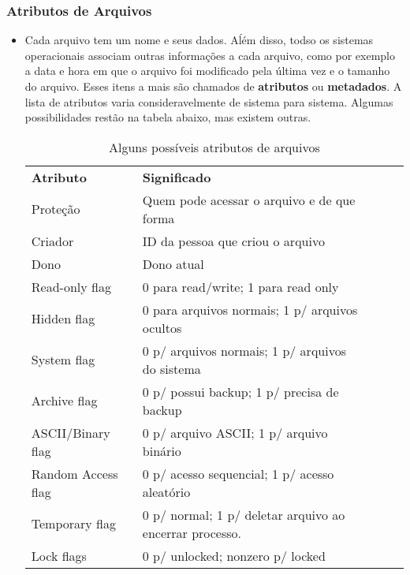 \documentclass[10pt]{article}
\begin{document}
\subsubsection{Atributos de Arquivos}
\begin{itemize}
    \item Cada arquivo tem um nome e seus dados. Aĺém disso, todso os sistemas operacionais associam outras informações a cada
    arquivo, como por exemplo a data e hora em que o arquivo foi modificado pela última vez e o tamanho do arquivo. Esses
    itens a mais são chamados de \textbf{atributos} ou \textbf{metadados}. A lista de atributos varia consideravelmente
    de sistema para sistema. Algumas possibilidades restão na tabela abaixo, mas existem outras.
    \begin{table}[!h]
        \centering
        \caption{Alguns possíveis atributos de arquivos}
        \label{atributos_arquivos}
        \begin{tabular}{lllll}
        \textbf{Atributo}       & \textbf{Significado}                                     &  &  &  \\
        Proteção                & Quem pode acessar o arquivo e de que forma               &  &  &  \\
        Criador                 & ID da pessoa que criou o arquivo                         &  &  &  \\
        Dono                    & Dono atual                                               &  &  &  \\
        Read-only flag          & 0 para read/write; 1 para read only                      &  &  &  \\
        Hidden flag             & 0 para arquivos normais; 1 p/ arquivos ocultos           &  &  &  \\
        System flag             & 0 p/ arquivos normais; 1 p/ arquivos do sistema          &  &  &  \\
        Archive flag            & 0 p/ possui backup; 1 p/ precisa de backup               &  &  &  \\
        ASCII/Binary flag       & 0 p/ arquivo ASCII; 1 p/ arquivo binário                 &  &  &  \\
        Random Access flag      & 0 p/ acesso sequencial; 1 p/ acesso aleatório            &  &  &  \\
        Temporary flag          & 0 p/ normal; 1 p/ deletar arquivo ao encerrar processo.  &  &  &  \\
        Lock flags              & 0 p/ unlocked; nonzero p/ locked                         &  &  &  \\

\end{tabular}
\end{table}
\end{itemize}
\end{document}
